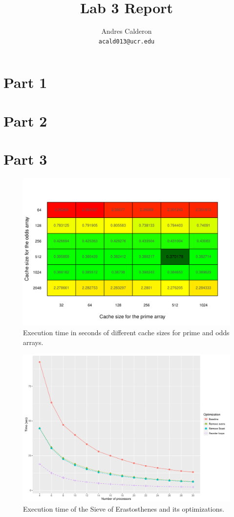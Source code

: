 \documentclass[10pt]{scrartcl}
\title{Lab 3 Report}
\author{
   Andres Calderon\\
  \small \texttt{acald013@ucr.edu}
}
\begin{document}
\maketitle

\section{Part 1}

\section{Part 2}



\section{Part 3}

\begin{figure}
  \centering
  \includegraphics[width=\textwidth]{cache}
  \caption{Execution time in seconds of different cache sizes for prime and odds arrays.}\label{fig:cache}
\end{figure}

\begin{figure}
  \centering
  \includegraphics[width=\textwidth]{plot}
  \caption{Execution time of the Sieve of Erastosthenes and its optimizations.}\label{fig:plot}
\end{figure}
\end{document}
